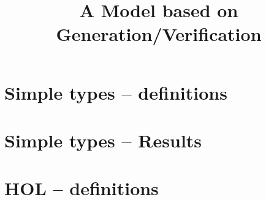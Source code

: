 \documentclass[a4paper]{article}
\title{A Model based on Generation/Verification}
\begin{document}
\maketitle

\section{Simple types -- definitions}


\section{Simple types -- Results}


\section{HOL -- definitions}




\end{document}
